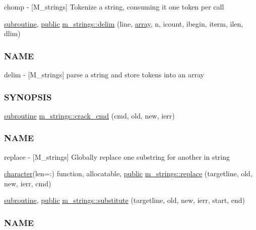 \begin{DoxyCompactItemize}
\begin{DoxyCompactList}
chomp -\/ \mbox{[}M\+\_\+strings\mbox{]} Tokenize a string, consuming it one token per call \end{DoxyCompactList}\item 
\hyperlink{M__stopwatch_83_8txt_acfbcff50169d691ff02d4a123ed70482}{subroutine}, \hyperlink{M__stopwatch_83_8txt_a2f74811300c361e53b430611a7d1769f}{public} \hyperlink{namespacem__strings_a9890da826d63d6f04367887007611cb5}{m\+\_\+strings\+::delim} (line, \hyperlink{intro__blas1_83_8txt_a89db1945e1a335ab0184c6a097821e32}{array}, n, icount, ibegin, iterm, ilen, dlim)
\begin{DoxyCompactList}\small\item\em \subsubsection*{N\+A\+ME}

delim -\/ \mbox{[}M\+\_\+strings\mbox{]} parse a string and store tokens into an array \subsubsection*{S\+Y\+N\+O\+P\+S\+IS}\end{DoxyCompactList}\item 
\hyperlink{M__stopwatch_83_8txt_acfbcff50169d691ff02d4a123ed70482}{subroutine} \hyperlink{namespacem__strings_a818d715927dd61c1be6df5d2cdec4e4c}{m\+\_\+strings\+::crack\+\_\+cmd} (cmd, old, new, ierr)
\begin{DoxyCompactList}\small\item\em \subsubsection*{N\+A\+ME}

replace -\/ \mbox{[}M\+\_\+strings\mbox{]} Globally replace one substring for another in string \end{DoxyCompactList}\item 
\hyperlink{option__stopwatch_83_8txt_abd4b21fbbd175834027b5224bfe97e66}{character}(len=\+:) function, allocatable, \hyperlink{M__stopwatch_83_8txt_a2f74811300c361e53b430611a7d1769f}{public} \hyperlink{namespacem__strings_a02d97675e95b9bd0ef3fd2abb9f2f435}{m\+\_\+strings\+::replace} (targetline, old, new, ierr, cmd)
\item 
\hyperlink{M__stopwatch_83_8txt_acfbcff50169d691ff02d4a123ed70482}{subroutine}, \hyperlink{M__stopwatch_83_8txt_a2f74811300c361e53b430611a7d1769f}{public} \hyperlink{namespacem__strings_ab84a4b7c2be211433c2d1b435a87fa32}{m\+\_\+strings\+::substitute} (targetline, old, new, ierr, start, end)
\begin{DoxyCompactList}\small\item\em \subsubsection*{N\+A\+ME}


\end{DoxyCompactList}
\end{DoxyCompactItemize}
